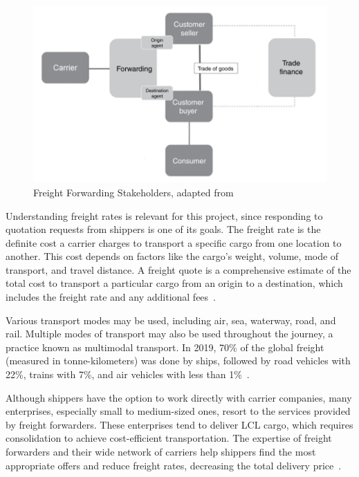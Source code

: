 \documentclass[12pt,reqno, oneside]{amsbook}
\theoremstyle{definition}
\theoremstyle{definition}
\numberwithin{section}{chapter}
\numberwithin{table}{chapter}
\numberwithin{figure}{chapter}
\begin{document}
\begin{figure}[H]
  \centering
  \includegraphics[width=1\linewidth]{images/FreightForwarding.png}
  \caption{\label{Figure:FreightForwarding}Freight Forwarding Stakeholders, adapted from~\cite{Peffers2007}}
\end{figure}

Understanding freight rates is relevant for this project, since responding to quotation requests from shippers is one of its goals. The freight rate is the definite cost a carrier charges to transport a specific cargo from one location to another. This cost depends on factors like the cargo's weight, volume, mode of transport, and travel distance. A freight quote is a comprehensive estimate of the total cost to transport a particular cargo from an origin to a destination, which includes the freight rate and any additional fees~\cite{Song2021, Mairon_Freight, Wang2021, WebCargo}.

Various transport modes may be used, including air, sea, waterway, road, and rail. Multiple modes of transport may also be used throughout the journey, a practice known as multimodal transport. In 2019, 70\% of the global freight (measured in tonne-kilometers) was done by ships, followed by road vehicles with 22\%, trains with 7\%, and air vehicles with less than 1\%~\cite{ITF2023}.

Although shippers have the option to work directly with carrier companies, many enterprises, especially small to medium-sized ones, resort to the services provided by freight forwarders. These enterprises tend to deliver \ac{LCL} cargo, which requires consolidation to achieve cost-efficient transportation. The expertise of freight forwarders and their wide network of carriers help shippers find the most appropriate offers and reduce freight rates, decreasing the total delivery price~\cite{Huang2019}.
\end{document}
